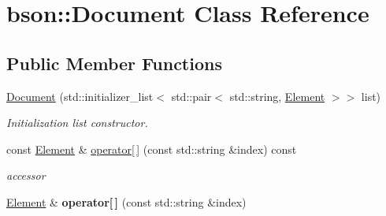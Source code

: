 \hypertarget{classbson_1_1_document}{\section{bson\+:\+:Document Class Reference}
\label{classbson_1_1_document}
}
\subsection*{Public Member Functions}
\begin{DoxyCompactItemize}
\item 
\hyperlink{classbson_1_1_document_ac2d96a9a7cc578ad769120bb1757a72d}{Document} (std\+::initializer\+\_\+list$<$ std\+::pair$<$ std\+::string, \hyperlink{classbson_1_1_element}{Element} $>$$>$ list)
\begin{DoxyCompactList}\small\item\em Initialization list constructor. \end{DoxyCompactList}\item 
const \hyperlink{classbson_1_1_element}{Element} \& \hyperlink{classbson_1_1_document_a37575739ba04bc0cdeab04828fcd6d7d}{operator\mbox{[}$\,$\mbox{]}} (const std\+::string \&index) const 
\begin{DoxyCompactList}\small\item\em accessor \end{DoxyCompactList}\item 
\hypertarget{classbson_1_1_document_a526ef4900d0842b9d2bf699dd32da7e4}{\hyperlink{classbson_1_1_element}{Element} \& {\bfseries operator\mbox{[}$\,$\mbox{]}} (const std\+::string \&index)}\label{classbson_1_1_document_a526ef4900d0842b9d2bf699dd32da7e4}


\end{DoxyCompactItemize}
